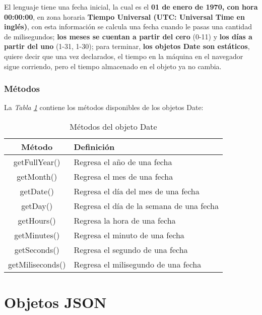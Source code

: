 El lenguaje tiene una fecha inicial, la cual es el \textbf{01 de enero de 1970, con hora 00:00:00}, en zona horaria \textbf{Tiempo Universal (UTC: Universal Time en inglés)}, con esta información se calcula una fecha cuando le pasas una cantidad de milisegundos; \textbf{los meses se cuentan a partir del cero} (0-11) y \textbf{los días a partir del uno} (1-31, 1-30); para terminar, \textbf{los objetos Date son estáticos}, quiere decir que una vez declarados, el tiempo en la máquina en el navegador sigue corriendo, pero el tiempo almacenado en el objeto ya no cambia.


\subsubsection{Métodos}

La \textit{Tabla \ref{tab: 8}} contiene los métodos disponibles de los objetos Date:
\begin{table}[H]
    \begin{center}
        \caption{Métodos del objeto Date}
        \label{tab: 8}
        \begin{tabular}{c l}
            \hline
            \textbf{Método}&\textbf{Definición} \\
            \hline
            getFullYear() & Regresa el año de una fecha \\
            getMonth() & Regresa el mes de una fecha \\
            getDate() & Regresa el día del mes de una fecha \\
            getDay() & Regresa el día de la semana de una fecha \\
            getHours() & Regresa la hora de una fecha \\
            getMinutes() & Regresa el minuto de una fecha \\
            getSeconds() & Regresa el segundo de una fecha \\
            getMiliseconds() & Regresa el milisegundo de una fecha \\
            \hline
        \end{tabular}
    \end{center}
\end{table}



\section{Objetos JSON}

